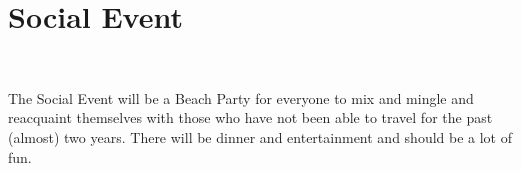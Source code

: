\clearpage
\section{Social Event}
\setheaders{}{\daydateyear}

\begin{center}



\daydateyear  \vspace{1em}\\
\end{center}

The Social Event will be a Beach Party for everyone to mix and mingle and reacquaint themselves with those who
have not been able to travel for the past (almost) two years.
There will be dinner and entertainment and should be a lot of fun.
